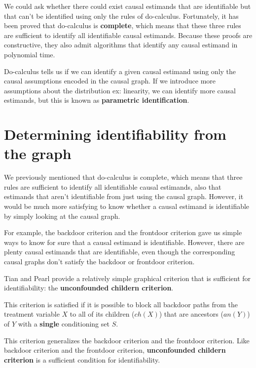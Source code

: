 We could ask whether there could exist causal estimands that are identifiable but that 
can’t be identified using only the rules of do-calculus. Fortunately, it 
has been proved that do-calculus is \textbf{complete}, which means that these three rules are
sufficient to identify all identifiable causal estimands. Because these proofs 
are constructive, they also admit algorithms that identify any causal estimand in 
polynomial time.

Do-calculus tells us if we can identify a given causal estimand using only the causal 
assumptions encoded in the causal graph. If we introduce more assumptions about the
distribution ex: linearity, we can identify more causal estimands, but this is 
known as \textbf{parametric identification}.

\section{Determining identifiability from the graph}
We previously mentioned that do-calculus is complete, which means that three rules are
sufficient to identify all identifiable causal estimands, also that estimands 
that aren't identifiable from just using the causal graph. However, it would be much more
satisfying to know whether a causal estimand is identifiable by simply looking at the causal graph.

For example, the backdoor criterion and the frontdoor criterion gave us simple ways to know
for sure that a causal estimand is identifiable. However, there are plenty causal estimands
that are identifiable, even though the corresponding causal graphs don't satisfy the backdoor
or frontdoor criterion.

Tian and Pearl provide a relatively simple graphical criterion that is sufficient for identifiability: the \textbf{unconfounded childern criterion}. 

\begin{definition}
    This criterion is satisfied if it is possible to block all backdoor paths from the
    treatment variable $X$ to all of its children ($ch(X)$) that are ancestors ($an(Y)$) of
    $Y$ with a \textbf{single} conditioning set $S$.
\end{definition}

This criterion generalizes the backdoor criterion and the frontdoor criterion. Like backdoor
criterion and the frontdoor criterion, \textbf{unconfounded childern criterion} is a sufficient
condition for identifiability.


